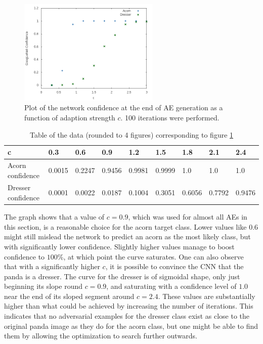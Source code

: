 \documentclass[11pt, a4paper]{article}
\begin{document}
\begin{figure}[h!tb]
	\centering
	\includegraphics[width=0.6\textwidth]{images/confidence-vs-coeff.png}
	\caption[Final network confidence w.r.t adaption strength coefficient]{Plot of the network confidence at the end of AE generation as a function of adaption strength $c$. 100 iterations were performed.}
	\label{fig:confidence-vs-coeff}
\end{figure}

\begin{table}[h!tb]
	\begin{tabular}{|l|llllllll|}
		\hline
		c & 0.3 & 0.6 & 0.9 & 1.2 & 1.5 & 1.8 & 2.1 & 2.4 \\
		\hline
		Acorn confidence & 0.0015 & 0.2247 & 0.9456 & 0.9981 & 0.9999 & 1.0 & 1.0 & 1.0 \\
		Dresser confidence & 0.0001 & 0.0022 & 0.0187 & 0.1004 & 0.3051 & 0.6056 & 0.7792 & 0.9476 \\
		\hline
	\end{tabular}
	\caption[Final network confidence w.r.t adaption strength coefficient]{Table of the data (rounded to 4 figures) corresponding to figure \ref{fig:confidence-vs-coeff}}
	\label{tab:confidence-vs-coeff}
\end{table}

The graph shows that a value of $c = 0.9$, which was used for almost all AEs in this section, is a reasonable choice for the acorn target class. Lower values like 0.6 might still mislead the network to predict an acorn as the most likely class, but with significantly lower confidence. Slightly higher values manage to boost confidence to $100\%$, at which point the curve saturates. One can also observe that with a significantly higher $c$, it is possible to convince the CNN that the panda is a dresser. The curve for the dresser is of sigmoidal shape, only just beginning its slope round $c = 0.9$, and saturating with a confidence level of $1.0$ near the end of its sloped segment around $c = 2.4$. These values are substantially higher than what could be achieved by increasing the number of iterations. This indicates that no adversarial examples for the dresser class exist as close to the original panda image as they do for the acorn class, but one might be able to find them by allowing the optimization to search further outwards.
\end{document}
